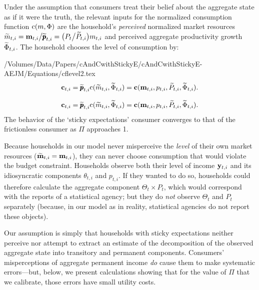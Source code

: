 \documentclass[titlepage]{./econtex}
\begin{document}
Under the assumption that consumers treat their belief about the aggregate state as if it were the truth, the relevant inputs for the normalized consumption function $\mathrm{c}(m,\Phi)$ are the household's \textit{perceived} normalized market resources $\widetilde{m}_{t,i} = \mathbf{m}_{t,i}\big/\widetilde{\pmb{p}}_{t,i} = \big(P_t\big/\widetilde{P}_{t,i}\big)m_{t,i}$ and perceived aggregate productivity growth $\widetilde{\Phi}_{t,i}$.  The household chooses the level of consumption by:
\begin{verbatimwrite}{/Volumes/Data/Papers/cAndCwithStickyE/cAndCwithStickyE-AEJM/Equations/cflevel2.tex}
\begin{equation*}
   \mathbf{c}_{t,i} = \widetilde{\pmb{p}}_{t,i} \mathrm{c}(\widetilde{m}_{t,i},\widetilde{\Phi}_{t,i}) = \textbf{c}(\mathbf{m}_{t,i}, p_{t,i}, \widetilde{P}_{t,i}, \widetilde{\Phi}_{t,i}). \label{eq:cPerc}
\end{equation*}
\end{verbatimwrite}
\begin{equation*}
   \mathbf{c}_{t,i} = \widetilde{\pmb{p}}_{t,i} \mathrm{c}(\widetilde{m}_{t,i},\widetilde{\Phi}_{t,i}) = \textbf{c}(\mathbf{m}_{t,i}, p_{t,i}, \widetilde{P}_{t,i}, \widetilde{\Phi}_{t,i}). \label{eq:cPerc}
\end{equation*}
 The behavior of the `sticky expectations' consumer converges to that of the frictionless consumer as $\Pi$ approaches 1.

Because households in our model never misperceive the \textit{level} of their own market resources ($\widetilde{\mathbf{m}}_{t,i}=\mathbf{m}_{t,i}$), they can never choose consumption that would violate the budget constraint.  Households observe both their level of income $\mathbf{y}_{t,i}$ and its idiosyncratic components $\theta_{t,i}$ and ${p}_{t,i}$. If they wanted to do so, households could therefore calculate the aggregate component $\Theta_{t}\times {P}_{t}$, which would correspond with the reports of a statistical agency; but they do \textit{not} observe $\Theta_{t}$ and ${P}_{t}$ separately (because, in our model as in reality, statistical agencies do not report these objects).

Our assumption is simply that households with sticky expectations neither perceive nor attempt to extract an estimate of the decomposition of the observed aggregate state into transitory and permanent components.  Consumers' misperceptions of aggregate permanent income \textit{do} cause them to make systematic errors---but, below, we present calculations showing that for the value of $\Pi$ that we calibrate, those errors have small utility costs.
\end{document}
